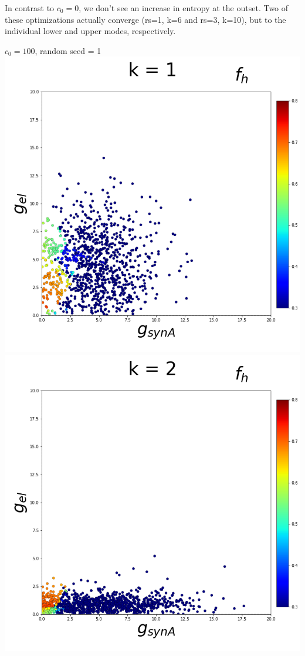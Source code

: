 \documentclass[11pt]{article}
\begin{document}
In contrast to $c_0 = 0$, we don't see an increase in entropy at the outset.  Two of these optimizations actually converge (rs=1, k=6 and rs=3, k=10), but to the individual lower and upper modes, respectively.

\begin{center}
{\Large $c_0 = 100$, random seed = 1} \\
\includegraphics[scale=0.125]{DSN_figs/STGCircuit_DSN_c=2_rs=1_k=1.png}
\includegraphics[scale=0.125]{DSN_figs/STGCircuit_DSN_c=2_rs=1_k=2.png}

\end{center}
\end{document}
